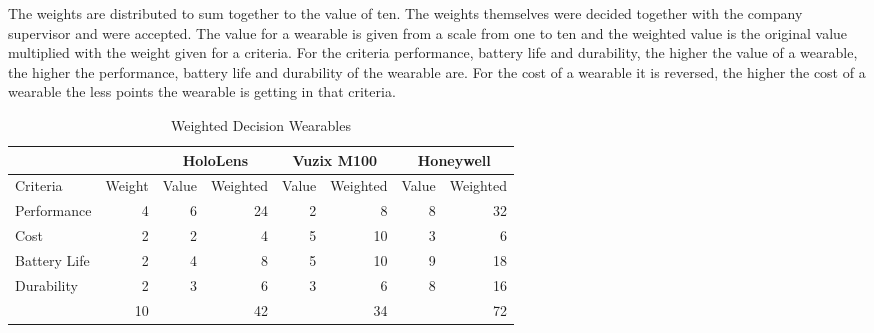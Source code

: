 The weights are distributed to sum together to the value of ten. The weights themselves were decided together with the company supervisor and were accepted. The value for a wearable is given from a scale from one to ten and the weighted value is the original value multiplied with the weight given for a criteria. For the criteria performance, battery life and durability, the higher the value of a wearable, the higher the performance, battery life and durability of the wearable are. For the cost of a wearable it is reversed, the higher the cost of a wearable the less points the wearable is getting in that criteria.

\begin{table}[htbp]
\centering
\begin{tabular}{|lr|rr|rr|rr|} \hline
             &                            & \multicolumn{2}{c|}{HoloLens}                             & \multicolumn{2}{c|}{Vuzix M100}                           & \multicolumn{2}{c|}{Honeywell}                            \\ \hline
Criteria     & \multicolumn{1}{l|}{Weight} & \multicolumn{1}{l}{Value} & \multicolumn{1}{l|}{Weighted} & \multicolumn{1}{l}{Value} & \multicolumn{1}{l|}{Weighted} & \multicolumn{1}{l}{Value} & \multicolumn{1}{l|}{Weighted} \\
Performance  & 4                          & 6                         & 24                           & 2                         & 8                            & 8                         & 32                           \\
Cost         & 2                          & 2                         & 4                            & 5                         & 10                           & 3                         & 6                            \\
Battery Life & 2                          & 4                         & 8                            & 5                         & 10                           & 9                         & 18                           \\
Durability   & 2                          & 3                         & 6                            & 3                         & 6                            & 8                         & 16                           \\ \hline
             & 10                         &                           & 42                           &                           & 34                           &                           & 72                           \\ \hline
\end{tabular}
\caption{Weighted Decision Wearables}
\label{tab:weightedDecision}
\end{table}

